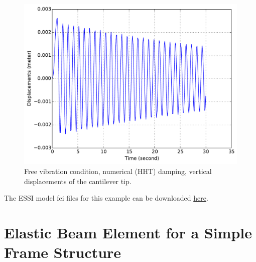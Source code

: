 \documentclass[fleqn,11pt]{article}
\begin{document}
\begin{figure}[!htb]
  \centering
  \includegraphics[width=12cm]{../Figure-files/_Chapter_Appendix_Illustrative_Examples/beam-1element-HHT-damping.pdf}
  \caption{Free vibration condition, numerical (HHT) damping, vertical displacements of the cantilever tip.}
  \label{fig_1beam_HHT}
\end{figure}




The    ESSI   model   fei   files   for   this   example   can   be   downloaded
\href{https://github.com/BorisJeremic/Real-ESSI-Examples/blob/master/model_fei_file/beam_elastic_damping_dynamic/beam_elastic_damping_dynamic.tgz?raw=true}{here}.









\section{Elastic Beam Element for a Simple Frame Structure}
\end{document}
